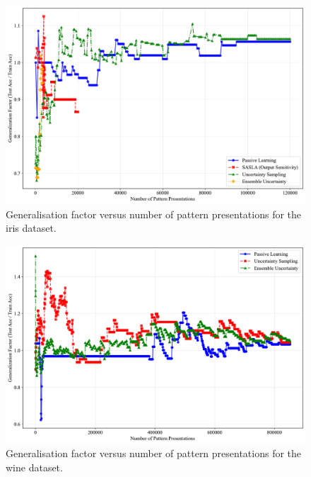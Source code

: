 \documentclass[10pt, conference]{IEEEtran}
\begin{document}
\begin{figure}[!t]
	\centering
	\includegraphics[width=\linewidth]{../results/iris/generalization_factor_vs_presentations.pdf}
	\caption{Generalisation factor versus number of pattern presentations for the iris dataset.}
	\label{fig:gf_iris}
\end{figure}

\begin{figure}[!t]
	\centering
	\includegraphics[width=\linewidth]{../results/wine/generalization_factor_vs_presentations.pdf}
	\caption{Generalisation factor versus number of pattern presentations for the wine dataset.}
	\label{fig:gf_wine}
\end{figure}
\end{document}
